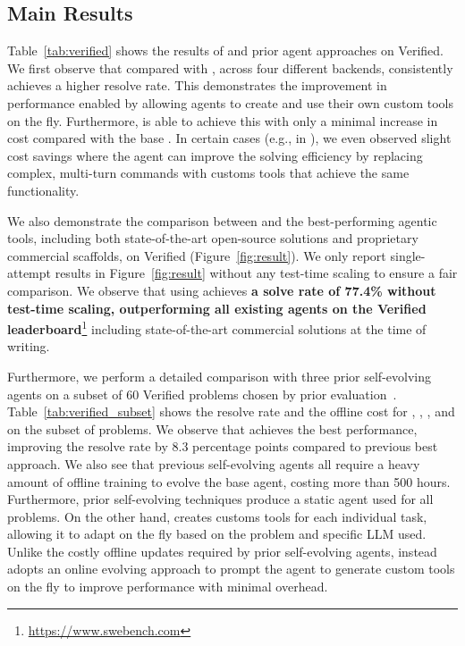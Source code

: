 \subsection{Main Results}

Table~\ref{tab:verified} shows the results of \tech and prior agent approaches on \swebench Verified. 
We first observe that compared with \minisweagent{}, across four different \llm backends, \tech consistently achieves a higher resolve rate.
This demonstrates the improvement in performance enabled by allowing agents to create and use their own custom tools on the fly.
Furthermore, \tech is able to achieve this with only a minimal increase in cost compared with the base \minisweagent.
In certain cases (e.g., in \gptfive{}), we even observed slight cost savings where the agent can improve the solving efficiency by replacing complex, multi-turn commands with customs tools that achieve the same functionality.


We also demonstrate the comparison between \tech and the best-performing agentic tools, including both state-of-the-art open-source solutions and proprietary commercial scaffolds, on \swebench Verified (Figure~\ref{fig:result}).
We only report single-attempt results in Figure~\ref{fig:result} without any test-time scaling to ensure a fair comparison.
We observe that \tech using \geminithreepro{} achieves \textbf{a solve rate of 77.4\% without test-time scaling, outperforming all existing agents on the \swebench Verified leaderboard}\footnote{\url{https://www.swebench.com}} including state-of-the-art commercial solutions at the time of writing.

Furthermore, we perform a detailed comparison with three prior self-evolving agents on a subset of 60 \swebench Verified problems chosen by prior evaluation~\citep{wang2025huxley}.
Table~\ref{tab:verified_subset} shows the resolve rate and the offline cost for \sica, \dgm, \hgm, and \tech on the subset of problems.
We observe that \tech achieves the best performance, improving the resolve rate by 8.3 percentage points compared to previous best approach.
We also see that previous self-evolving agents all require a heavy amount of offline training to evolve the base agent, costing more than 500 hours.
Furthermore, prior self-evolving techniques produce a static agent used for all problems.
On the other hand, \tech creates customs tools for each individual task, allowing it to adapt on the fly based on the problem and specific LLM used.
Unlike the costly offline updates required by prior self-evolving agents, \tech instead adopts an online evolving approach to prompt the agent to generate custom tools on the fly to improve performance with minimal overhead.

